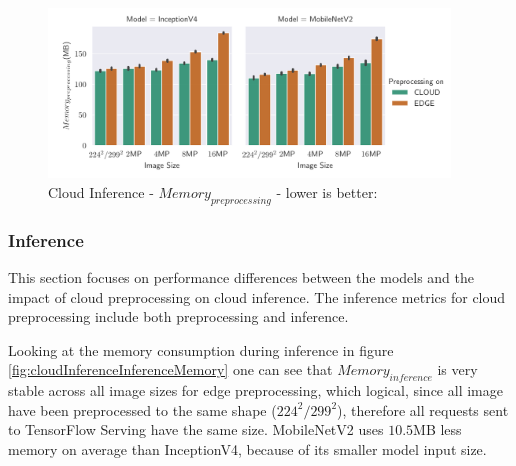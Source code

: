 \begin{figure}[!htb]
\centering
\includegraphics[width=0.95\textwidth]{./Bilder/single_plots/cloud_inference_plots/Cloud_Inference_Preprocessing_Memory.pdf}
\caption{Cloud Inference -  $Memory_{preprocessing}$ - lower is better:}
\label{fig:cloudInferencePreproMemory}
\end{figure}

\FloatBarrier
\subsubsection{Inference}
This section focuses on performance differences between the models and the impact of cloud preprocessing on cloud inference.
The inference metrics for cloud preprocessing include both preprocessing and inference.


Looking at the memory consumption during inference in figure \ref{fig:cloudInferenceInferenceMemory} one can see that $Memory_{inference}$ is very stable across all image sizes for edge preprocessing, which logical, since all image have been preprocessed to the same shape ($224^2/299^2$), therefore all requests sent to TensorFlow Serving have the same size.
MobileNetV2 uses $10.5$MB less memory on average than InceptionV4, because of its smaller model input size.

